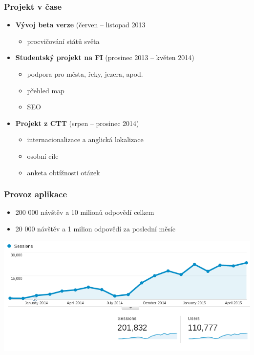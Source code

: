 \documentclass[xcolor=svgnames]{beamer}
\begin{document}
\begin{frame}
	\frametitle{Projekt v čase}
  \begin{itemize}
    \item \textbf{Vývoj beta verze} (červen -- listopad 2013
    \begin{itemize}
      \item procvičování států světa
    \end{itemize}
    \item \textbf{Studentský projekt na FI} (prosinec 2013 -- květen 2014)
    \begin{itemize}
      \item podpora pro města, řeky, jezera, apod.
      \item přehled map
      \item SEO
    \end{itemize}
    \item \textbf{Projekt z CTT} (srpen -- prosinec 2014)
    \begin{itemize}
      \item internacionalizace a anglická lokalizace
      \item osobní cíle
      \item anketa obtížnosti otázek
    \end{itemize}
  \end{itemize}
\end{frame}
\begin{frame}
	\frametitle{Provoz aplikace}
  \begin{itemize}
    \item 200 000 návštěv a 10 milionů odpovědí celkem
    \item 20 000 návštěv a 1 milion odpovědí za poslední měsíc
  \end{itemize}
   \includegraphics[width=\textwidth]{img/audience.png}
\end{frame}
\end{document}
